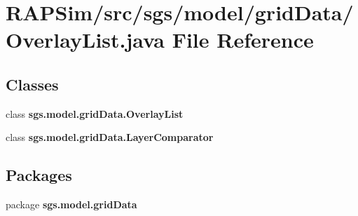 \section{R\-A\-P\-Sim/src/sgs/model/grid\-Data/\-Overlay\-List.java File Reference}
\label{_overlay_list_8java}
\subsection*{Classes}
\begin{DoxyCompactItemize}
\item 
class {\bf sgs.\-model.\-grid\-Data.\-Overlay\-List}
\item 
class {\bfseries sgs.\-model.\-grid\-Data.\-Layer\-Comparator}
\end{DoxyCompactItemize}
\subsection*{Packages}
\begin{DoxyCompactItemize}
\item 
package {\bf sgs.\-model.\-grid\-Data}
\end{DoxyCompactItemize}
